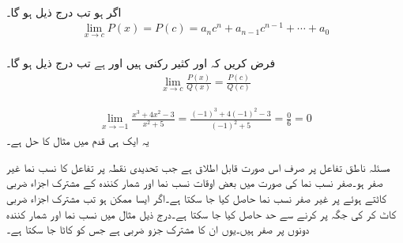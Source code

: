 \\
اگر  ہو تب درج ذیل ہو گا۔
\begin{align*}
\lim\limits_{x\to c} P(x)=P(c)=a_nc^n+a_{n-1}c^{n-1}+\cdots+a_0
\end{align*}
\\
فرض کریں کہ  اور  کثیر رکنی ہیں اور  ہے تب درج ذیل ہو گا۔
\begin{align*}
\lim\limits_{x\to c} \frac{P(x)}{Q(x)}=\frac{P(c)}{Q(c)}
\end{align*}

\begin{align*}
\lim_{x\to -1}\frac{x^3+4x^2-3}{x^2+5}=\frac{(-1)^3+4(-1)^2-3}{(-1)^2+5}=\frac{0}{6}=0
\end{align*}
یہ ایک ہی قدم میں مثال  کا حل ہے۔

مسئلہ  ناطق تفاعل پر صرف اس صورت قابل اطلاق ہے جب تحدیدی نقطہ   پر تفاعل کا نسب نما غیر صفر ہو۔صفر نسب نما کی صورت میں بعض اوقات نسب نما اور شمار کنندہ کے مشترک اجزاء ضربی   کاٹتے ہوئے   پر غیر صفر نسب نما حاصل کیا جا سکتا ہے۔اگر ایسا ممکن ہو تب مشترک اجزاء ضربی کاٹ کر  کی جگہ  پر کرنے سے حد حاصل کیا جا سکتا ہے۔درج ذیل مثال میں نسب نما اور شمار کنندہ دونوں  پر صفر ہیں۔یوں  ان کا مشترک جزو ضربی ہے جس کو کاٹا جا سکتا ہے۔

